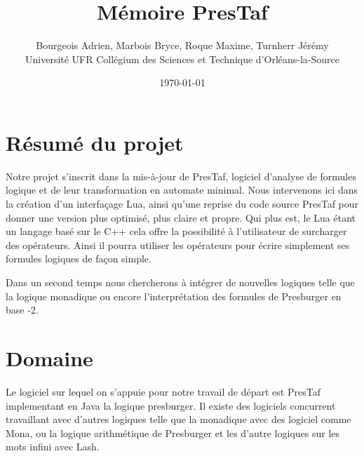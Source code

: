 \documentclass{article}%
\begin{document}
\title{Mémoire PresTaf}

\author{Bourgeois Adrien, Marbois Bryce, Roque Maxime, Turnherr Jérémy%
\\Université UFR Collégium des Sciences et Technique d'Orléans-la-Source}
\date{\today}
\maketitle



\clearpage

\tableofcontents

\cleardoublepage

\section{Résumé du projet}

Notre projet s'inscrit dans la mis-à-jour de PresTaf, logiciel d'analyse de formules logique et de leur transformation en automate minimal. Nous intervenons ici dans la création d'un interfaçage Lua, ainsi qu'une reprise du code source PresTaf pour donner une version plus optimisé, plus claire et propre. Qui plus est, le Lua étant un langage basé sur le C++ cela offre la possibilité à l'utilisateur de surcharger des opérateurs. Ainsi il pourra utiliser les opérateurs pour écrire simplement ses formules logiques de façon simple.\\\par

Dans un second temps nous chercherons à intégrer de nouvelles logiques telle que la logique monadique ou encore l'interprétation des formules de Presburger en base -2.

\section{Domaine}

Le logiciel sur lequel on s'appuie pour notre travail de départ est PresTaf implementant en Java la logique \gls{presburger}\cite{ginsburg1966semigroups}. Il existe des logiciels concurrent travaillant avec d'autres logiques telle que la \gls{monadique}\cite{KlaEtAl:Mona} avec des logiciel comme Mona\cite{monamanual2001}, ou la logique arithmétique de Presburger et les d'autre logiques sur les mots infini avec Lash\cite{lash}.
\end{document}
